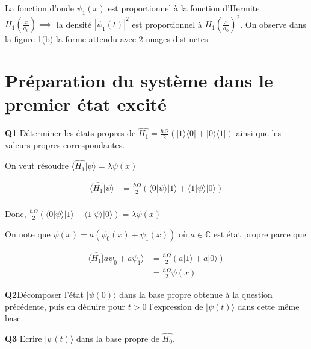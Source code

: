 \documentclass[french]{article}
\begin{document}
	La fonction d'onde $\psi_1(x)$ est proportionnel à la fonction d'Hermite $H_1(\frac{x}{a_0}) \implies $ la densité $|\psi_1(t)|^2$ est proportionnel à $H_1(\frac{x}{a_0})^2$. On observe dans la figure 1(b) la forme attendu avec $2$ nuages distinctes.

	\section{Préparation du système dans le premier état excité}

	\begin{tcolorbox}[colback=gray!5!white,colframe=gray!75!black]
		\textbf{\large{Q1}} Déterminer les états propres de $\hat{H_1} = \frac{\hbar \Omega}{2} \left(|1\rangle \langle 0| + |0\rangle \langle 1| \right)$  ainsi que les valeurs propres correspondantes.
	\end{tcolorbox}

	On veut résoudre $\langle \hat{H_1} | \psi \rangle = \lambda \psi(x)$
	
	\begin{align}
	\langle \hat{H_1} | \psi \rangle &= \frac{\hbar \Omega}{2} \left( \langle 0|\psi \rangle |1\rangle + \langle 1|\psi \rangle |0\rangle\right)\\
	\end{align}
	
	Donc, $\frac{\hbar \Omega}{2} \left( \langle 0|\psi \rangle |1\rangle + \langle 1|\psi \rangle |0\rangle\right) = \lambda \psi(x)$
	
	On note que $\psi(x) = a (\psi_0(x) + \psi_1(x))$ où $a \in \mathbb{C}$ est état propre parce que
	
	\begin{align}
		\langle \hat{H_1} | a\psi_0 + a\psi_1 \rangle &= \frac{\hbar \Omega}{2} \left( a |1\rangle + a |0\rangle\right)\\
		&= \frac{\hbar \Omega}{2}\psi(x)
	\end{align}

	\begin{tcolorbox}[colback=gray!5!white,colframe=gray!75!black]
		\textbf{\large{Q2}}Décomposer l'état $|\psi(0)\rangle$ dans la base propre obtenue à la question précédente, puis en déduire pour $t > 0$ l'expression de $|\psi(t)\rangle$ dans cette même base.
	\end{tcolorbox}

	\begin{tcolorbox}[colback=gray!5!white,colframe=gray!75!black]
		\textbf{\large{Q3}} Ecrire  $|\psi(t)\rangle$ dans la base propre de $\hat{H_0}$.
	\end{tcolorbox}
\end{document}
